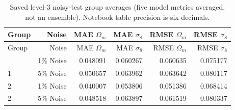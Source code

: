 \begingroup\footnotesize\setlength{\tabcolsep}{3pt}\renewcommand{\arraystretch}{1.05}
\begin{longtable}{lrrrrr}
\caption{Saved level-3 noisy-test group averages (five model metrics averaged, not an ensemble). Notebook table precision is six decimals.}\label{tab:noise}\\
\toprule
Group & Noise & MAE $\Omega_m$ & MAE $\sigma_8$ & RMSE $\Omega_m$ & RMSE $\sigma_8$ \\
\midrule
\endfirsthead
\toprule
Group & Noise & MAE $\Omega_m$ & MAE $\sigma_8$ & RMSE $\Omega_m$ & RMSE $\sigma_8$ \\
\midrule\endhead
\bottomrule\endfoot
1 & 1\% Noise & 0.048091 & 0.060267 & 0.060635 & 0.075177 \\
1 & 5\% Noise & 0.050657 & 0.063962 & 0.063642 & 0.080117 \\
2 & 1\% Noise & 0.040007 & 0.053806 & 0.051386 & 0.068414 \\
2 & 5\% Noise & 0.048518 & 0.063897 & 0.061519 & 0.080337 \\
\end{longtable}\endgroup
